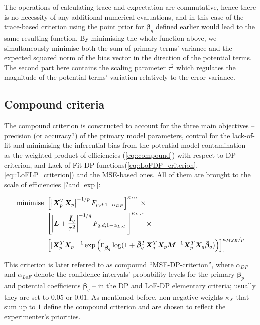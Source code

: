 The operations of calculating trace and expectation are commutative, hence there is no necessity of any additional numerical evaluations, and in this case of the trace-based criterion using the point prior for $\bm{\beta}_q$ defined earlier would lead to the same resulting function. By minimising the whole function above, we simultaneously minimise both the sum of primary terms' variance and the expected squared norm of the bias vector in the direction of the potential terms. The second part here contains the scaling parameter $\tau^2$ which regulates the magnitude of the potential terms' variation relatively to the error variance.  
 
\subsection*{Compound criteria}
The compound criterion is constructed to account for the three main objectives -- precision (or accuracy?) of the primary model parameters, control for the lack-of-fit and minimising the inferential bias from the potential model contamination -- as the weighted product of efficiencies (\ref{eq::compound}) with respect to DP-criterion, and Lack-of-Fit DP functions(\ref{eq::LoFDP_criterion}, \ref{eq::LoFLP_criterion}) and the MSE-based ones. All of them are brought to the scale of efficiencies [?and $\exp$]:

\begin{align}
\label{eq::MSE_D}
\mbox{minimise }&\left[\left|\bm{X}^T_{p}\bm{X}_{p}\right|^{-1/p}F_{p,d;1-\alpha_{DP}}\right]^{\kappa_{DP}} \times \notag \\ &\left[\left|\bm{L}+\frac{\bm{I}_{q}}{\tau^{2}}\right|^{-1/q}F_{q,d;1-\alpha_{LoF}}\right]^{\kappa_{LoF}}\times \notag\\ & \left[|\bm{X}^T_{p}\bm{X}_{p}|^{-1}\exp\left(\mathtt{E}_{\bm{\tilde{\beta}}_q}\log(1+\bm{\tilde{\beta}}_q^T\bm{X}_q^{T}\bm{X}_p\bm{M}^{-1}\bm{X}_p^{T}\bm{X}_q\bm{\tilde{\beta}}_q) \right)\right]_{.}^{\kappa_{MSE}/p}
\end{align}
 
This criterion is later referred to as compound ``MSE-DP-criterion'', where $\alpha_{DP}$ and $\alpha_{LoF}$ denote the confidence intervals' probability levels for the primary $\bm{\beta}_p$ and potential coefficients $\bm{\beta}_q$ -- in the DP and LoF-DP elementary criteria; usually they are set to $0.05$ or $0.01$. As mentioned before, non-negative weights $\kappa_X$ that sum up to $1$ define the compound criterion and are chosen to reflect the experimenter's priorities. 

